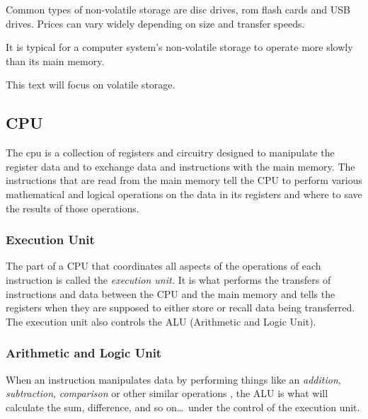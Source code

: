 Common types of non-volatile storage are disc drives, 
\acrshort{rom} flash cards and USB 
drives.  Prices can vary widely depending on size and transfer speeds.

It is typical for a computer system's non-volatile storage to operate
more slowly than its main memory.

This text will focus on volatile storage.

\subsection{CPU}

The \acrshort{cpu} is a collection of registers and circuitry designed to
manipulate the register data and to exchange data and instructions with the 
main memory.  The instructions that are read from the main memory tell 
the CPU to perform various mathematical and logical operations on the data 
in its registers and where to save the results of those operations.

\subsubsection{Execution Unit}

The part of a CPU that coordinates all aspects of the operations of each 
instruction is called the {\em execution unit.}  It is what performs the transfers 
of instructions and data between the CPU and the main memory and tells the 
registers when they are supposed to either store or recall data being transferred.  
The execution unit also controls the ALU (Arithmetic and Logic Unit).

\subsubsection{Arithmetic and Logic Unit}

When an instruction manipulates data by performing things like an {\em addition},
{\em subtraction}, {\em comparison} or other similar operations , the ALU is what
will calculate the sum, difference, and so on\ldots\ under the control of the 
execution unit.



